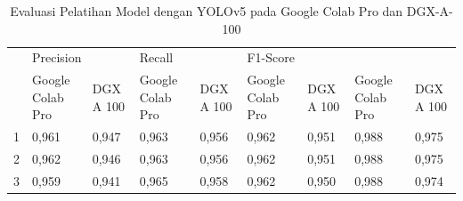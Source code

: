 \begin{singlespace}
	\begin{table}[H]
		\centering
		\caption{Evaluasi Pelatihan Model dengan YOLOv5 pada Google Colab Pro dan DGX-A-100}
		\label{tbl:Evaluasi-Pelatihan-Model-Dengan-YOLOv5-Colab-DGX}
		\begin{tabular}{|p{1cm}|p{1cm}p{1cm}|p{1cm}p{1cm}|p{1cm}p{1cm}|p{1cm}p{1cm}|}
			\hline
			\rowcolor[HTML]{D9D9D9} 
			\cellcolor[HTML]{D9D9D9}                       & \multicolumn{2}{p{1cm}|}{\cellcolor[HTML]{D9D9D9}Precision}                    & \multicolumn{2}{p{1cm}|}{\cellcolor[HTML]{D9D9D9}Recall}                       & \multicolumn{2}{p{1cm}|}{\cellcolor[HTML]{D9D9D9}F1-Score}                     & \multicolumn{2}{p{1cm}|}{\cellcolor[HTML]{D9D9D9}{\color[HTML]{333333} mAP@.5}} \\ \cline{2-9} 
			
			\rowcolor[HTML]{D9D9D9} 
			\multirow{-2}{*}{\cellcolor[HTML]{D9D9D9}Fold} & \multicolumn{1}{p{1cm}|}{\cellcolor[HTML]{D9D9D9}Google Colab Pro} & DGX A 100 & \multicolumn{1}{p{1cm}|}{\cellcolor[HTML]{D9D9D9}Google Colab Pro} & DGX A 100 & \multicolumn{1}{p{1cm}|}{\cellcolor[HTML]{D9D9D9}Google Colab Pro} & DGX A 100 & \multicolumn{1}{p{1cm}|}{\cellcolor[HTML]{D9D9D9}Google Colab Pro}  & DGX A 100 \\ \hline
			
			1                                              & \multicolumn{1}{p{1cm}|}{0,961}                                    & 0,947     & \multicolumn{1}{p{1cm}|}{0,963}                                    & 0,956     & \multicolumn{1}{p{1cm}|}{0,962}                                    & 0,951     & \multicolumn{1}{p{1cm}|}{0,988}                                     & 0,975     \\ \hline
			
			2                                              & \multicolumn{1}{p{1cm}|}{0,962}                                    & 0,946     & \multicolumn{1}{p{1cm}|}{0,963}                                    & 0,956     & \multicolumn{1}{p{1cm}|}{0,962}                                    & 0,951     & \multicolumn{1}{p{1cm}|}{0,988}                                     & 0,975     \\ \hline
			
			3                                              & \multicolumn{1}{p{1cm}|}{0,959}                                    & 0,941     & \multicolumn{1}{p{1cm}|}{0,965}                                    & 0,958     & \multicolumn{1}{p{1cm}|}{0,962}                                    & 0,950     & \multicolumn{1}{p{1cm}|}{0,988}                                     & 0,974     \\ \hline
			

\end{tabular}
\end{table}
\end{singlespace}
